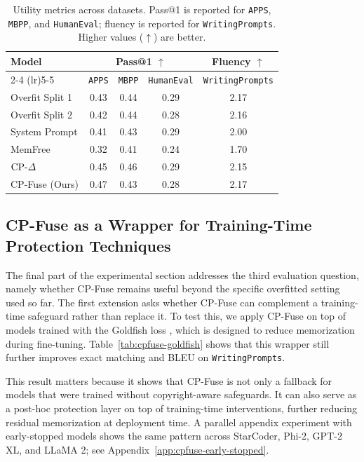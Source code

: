 \begin{table}[tbp]
\centering
\small
\setlength{\tabcolsep}{5pt}
\caption{Utility metrics across datasets. Pass@1 is reported for \texttt{APPS}, \texttt{MBPP}, and \texttt{HumanEval}; fluency is reported for \texttt{WritingPrompts}. Higher values (\(\uparrow\)) are better.}
\label{tab:cpfuse-utility}
\begin{tabular}{lcccc}
\toprule
\textbf{Model} & \multicolumn{3}{c}{\textbf{Pass@1} \(\uparrow\)} & \textbf{Fluency} \(\uparrow\) \\
\cmidrule(lr){2-4} \cmidrule(lr){5-5}
& \texttt{APPS} & \texttt{MBPP} & \texttt{HumanEval} & \texttt{WritingPrompts} \\
\midrule
Overfit Split 1 & 0.43 & 0.44 & 0.29 & 2.17 \\
Overfit Split 2 & 0.42 & 0.44 & 0.28 & 2.16 \\
\midrule
System Prompt & 0.41 & 0.43 & 0.29 & 2.00 \\
MemFree & 0.32 & 0.41 & 0.24 & 1.70 \\
\(\text{CP-}\Delta\) & 0.45 & 0.46 & 0.29 & 2.15 \\
CP-Fuse (Ours) & 0.47 & 0.43 & 0.28 & 2.17 \\
\bottomrule
\end{tabular}
\end{table}

\subsection{CP-Fuse as a Wrapper for Training-Time Protection Techniques}
\label{sec:cpfuse-wrapper}

The final part of the experimental section addresses the third evaluation question, namely whether CP-Fuse remains useful beyond the specific overfitted setting used so far. The first extension asks whether CP-Fuse can complement a training-time safeguard rather than replace it. To test this, we apply CP-Fuse on top of models trained with the Goldfish loss \citep{hans2024like}, which is designed to reduce memorization during fine-tuning. Table~\ref{tab:cpfuse-goldfish} shows that this wrapper still further improves exact matching and BLEU on \texttt{WritingPrompts}.

This result matters because it shows that CP-Fuse is not only a fallback for models that were trained without copyright-aware safeguards. It can also serve as a post-hoc protection layer on top of training-time interventions, further reducing residual memorization at deployment time. A parallel appendix experiment with early-stopped models shows the same pattern across StarCoder, Phi-2, GPT-2 XL, and LLaMA 2; see Appendix~\ref{app:cpfuse-early-stopped}.

